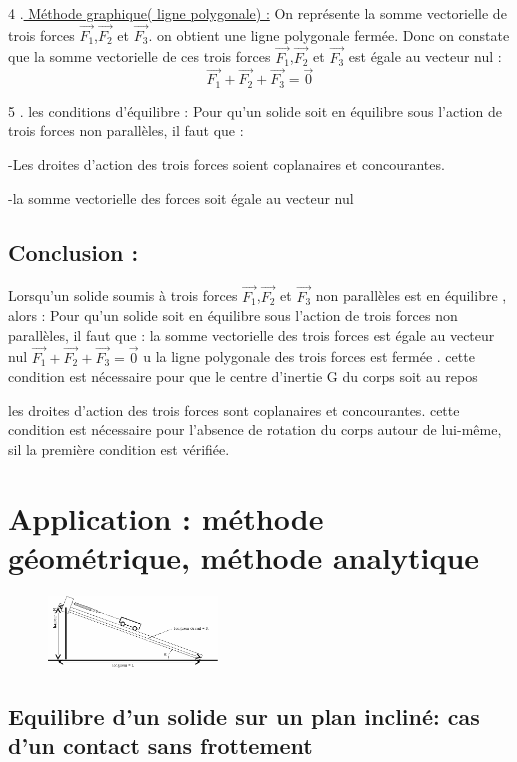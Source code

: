 \documentclass[12pt]{article}
\begin{document}
4 .\underline{ Méthode graphique( ligne polygonale) :} On représente la somme vectorielle de trois forces $\vec{F_1}$,$\vec{F_2}$ et $\vec{F_3}$. on obtient une ligne polygonale
fermée. Donc on constate que la somme vectorielle de ces trois forces $\vec{F_1}$,$\vec{F_2}$ et $\vec{F_3} $ est égale au
vecteur nul : \[\vec{F_1} + \vec{F_2} +  \vec{F_3} = \vec{0} \]

5 . les conditions d’équilibre :  Pour qu’un solide soit en équilibre sous l’action de trois forces non parallèles, il faut que :

-Les droites d’action des trois forces soient coplanaires et concourantes.

-la somme vectorielle des forces soit égale au vecteur nul

\subsection{Conclusion : }
Lorsqu’un solide soumis à trois forces $\vec{F_1}$,$\vec{F_2}$ et $\vec{F_3}$ non parallèles est en équilibre , alors :  
 Pour qu’un solide soit en équilibre sous l’action de trois forces non parallèles, il faut que :
 la somme vectorielle des trois forces est égale au vecteur nul $ \vec{F_1} + \vec{F_2} +  \vec{F_3} = \vec{0}$  u la ligne polygonale des trois forces est fermée . cette condition est nécessaire pour que le centre d’inertie G
du corps soit au repos 

les droites d’action des trois forces sont coplanaires et concourantes. cette condition est nécessaire pour
l’absence de rotation du corps autour de lui-même, sil la première condition est vérifiée.

\section{Application : méthode géométrique, méthode analytique }
 
\begin{figure}
\includegraphics[width=0.4\textwidth]{./img/img03.png}
\end{figure}

\subsection{ Equilibre d’un solide sur un plan incliné: cas d’un contact sans frottement}
\end{document}

